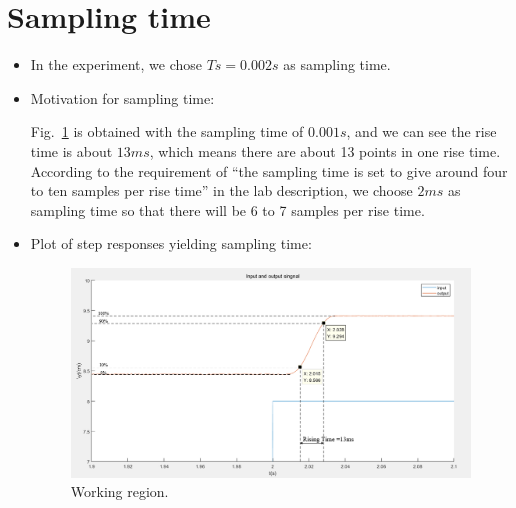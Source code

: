 \documentclass[10pt,a4paper]{article}
\begin{document}
\section{Sampling time}
\begin{itemize}
    \item In the experiment, we chose $Ts = 0.002s$ as sampling time.
    \item Motivation for sampling time:
    \par Fig.~\ref{fig:samplingTime} is obtained with the sampling time of $0.001s$, and we can see the rise time is about $13ms$, which means there are about 13 points in one rise time. According to the requirement of ``the sampling time is set to give around four to ten samples per rise time'' in the lab description, we choose $2ms$ as sampling time so that there will be 6 to 7 samples per rise time.
    \item Plot of step responses yielding sampling time:
    \begin{figure}[h]
		\footnotesize
		\centering 
		\includegraphics[width=0.8\columnwidth]{findSamplingTime.png} 
		\caption{Working region.}
		\label{fig:samplingTime}
	\end{figure}
\end{itemize}

\end{document}
